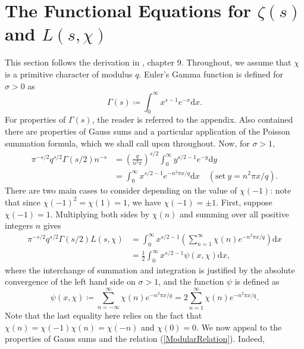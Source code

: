 \section{The Functional Equations for \texorpdfstring{$\zeta(s)$}{Lg} and \texorpdfstring{$L(s, \chi)$}{Lg}}
This section follows the derivation in \cite{davenport}, chapter 9. Throughout, we assume that $\chi$ is a primitive character of modulus $q$. Euler's Gamma function is defined for $\sigma > 0$ as 
\begin{equation}
    \Gamma(s) \coloneqq \int_{0}^{\infty}x^{s - 1} e^{-x} \mathrm{d} x. \nonumber
\end{equation}
For properties of $\Gamma(s)$, the reader is referred to the appendix. Also contained there are properties of Gauss sums and a particular application of the Poisson summation formula, which we shall call upon throughout. Now, for $\sigma > 1$,
\begin{align}
    \label{FirstIdentity}
    \pi^{-s/2} q^{s/2} \Gamma(s/2) n^{-s} &= \left(\frac{q}{n^2 \pi}\right)^{s/2} \int_{0}^{\infty} y^{s/2 - 1} e^{-y} \mathrm{d} y \nonumber \\
    &= \int_{0}^{\infty} x^{s/2 - 1} e^{-n^{2} \pi x / q} \mathrm{d} x \quad (\textrm{set} \ y = n^{2}\pi x /q).
\end{align}
There are two main cases to consider depending on the value of $\chi(-1)$: note that since $\chi(-1)^{2} = \chi(1) = 1$, we have $\chi(-1) = \pm 1$. First, suppose $\chi(-1) = 1$. Multiplying both sides by $\chi(n)$ and summing over all positive integers $n$ gives
\begin{align}
    \pi^{-s/2} q^{s/2} \Gamma(s/2) L(s, \chi) &= \int_{0}^{\infty} x^{s/2 - 1} \left(\sum_{n=1}^{\infty}\chi(n) e^{-n^{2} \pi x / q} \right) \mathrm{d} x \nonumber \\
    &= \frac12 \int_{0}^{\infty} x^{s/2 - 1} \psi(x, \chi) \mathrm{d} x, \nonumber
\end{align}
where the interchange of summation and integration is justified by the absolute convergence of the left hand side on $\sigma > 1$, and the function $\psi$ is defined as
\begin{equation}
    \psi(x, \chi) \coloneqq \sum_{n=-\infty}^{\infty}\chi(n) e^{-n^{2}\pi x/q} = 2\sum_{n=1}^{\infty}\chi(n) e^{-n^{2}\pi x/q}. \nonumber
\end{equation}
Note that the last equality here relies on the fact that $\chi(n) = \chi(-1)\chi(n) = \chi(-n)$ and $\chi(0) = 0$. We now appeal to the properties of Gauss sums and the relation (\ref{ModularRelation}). Indeed,
